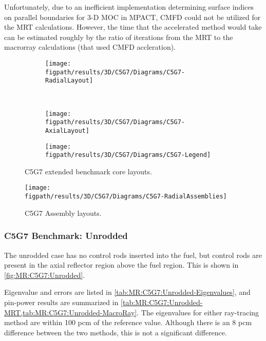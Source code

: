 {{{      Unfortunately, due to an inefficient implementation determining surface indices on parallel boundaries for 3-D \ac{MOC} in MPACT, \ac{CMFD} could not be utilized for the \ac{MRT} calculations.
      However, the time that the accelerated method would take can be estimated roughly by the ratio of iterations from the \ac{MRT} to the macrorray calculations (that used \ac{CMFD} accleration).

      \begin{figure}[htbp]
        \centering
        \begin{subfigure}[t]{0.45\textwidth}
          \centering
          \texttt{[image: \\figpath/results/3D/C5G7/Diagrams/C5G7-RadialLayout]}
        \end{subfigure}%
        ~
        \begin{subfigure}[t]{0.45\textwidth}
          \centering
          \texttt{[image: \\figpath/results/3D/C5G7/Diagrams/C5G7-AxialLayout]}
        \end{subfigure}
        \begin{subfigure}[t]{0.65\textwidth}
          \centering
          \texttt{[image: \\figpath/results/3D/C5G7/Diagrams/C5G7-Legend]}
        \end{subfigure}
        \caption{C5G7 extended benchmark core layouts. \label{figs:MR:C5G7:Layout}}
      \end{figure}

      \begin{figure}[htbp]
        \centering
        \texttt{[image: \\figpath/results/3D/C5G7/Diagrams/C5G7-RadialAssemblies]}
        \caption{C5G7 Assembly layouts.\label{fig:MR:C5G7:RadialAssemblyLayout}}
      \end{figure}

      \subsubsection{C5G7 Benchmark: Unrodded}{\label{sssec:MR:C5G7:Unrodded}
        The unrodded case has no control rods inserted into the fuel, but control rods are present in the axial reflector region above the fuel region.
        This is shown in \cref{fig:MR:C5G7:Unrodded}.

        Eigenvalue and errors are listed in \cref{tab:MR:C5G7:Unrodded-Eigenvalues}, and pin-power results are summarized in \cref{tab:MR:C5G7:Unrodded-MRT,tab:MR:C5G7:Unrodded-MacroRay}.
        The eigenvalues for either ray-tracing method are within 100 pcm of the reference value.
        Although there is an 8 pcm difference between the two methods, this is not a significant difference.

}}}}
